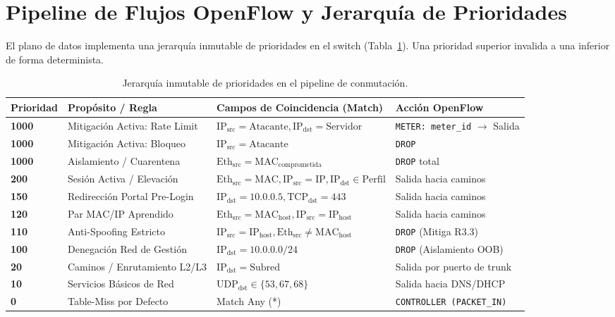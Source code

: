\documentclass[11pt,a4paper]{report}
\begin{document}
\section{Pipeline de Flujos OpenFlow y Jerarquía de Prioridades}
El plano de datos implementa una jerarquía inmutable de prioridades en el switch (Tabla~\ref{tab:pipeline}). Una prioridad superior invalida a una inferior de forma determinista.

\begin{table}[h!]
\centering
\small
\begin{tabularx}{\linewidth}{lp{4.2cm}p{4.2cm}X}
\toprule
\textbf{Prioridad} & \textbf{Propósito / Regla} & \textbf{Campos de Coincidencia (Match)} & \textbf{Acción OpenFlow} \\
\midrule
\textbf{1000} & Mitigación Activa: Rate Limit & $\text{IP}_{\text{src}} = \text{Atacante}, \text{IP}_{\text{dst}} = \text{Servidor}$ & \texttt{METER: meter\_id} $\rightarrow$ Salida \\
\textbf{1000} & Mitigación Activa: Bloqueo & $\text{IP}_{\text{src}} = \text{Atacante}$ & \texttt{DROP} \\
\textbf{1000} & Aislamiento / Cuarentena & $\text{Eth}_{\text{src}} = \text{MAC}_{\text{comprometida}}$ & \texttt{DROP} total \\
\textbf{200} & Sesión Activa / Elevación & $\text{Eth}_{\text{src}} = \text{MAC}, \text{IP}_{\text{src}} = \text{IP}, \text{IP}_{\text{dst}} \in \text{Perfil}$ & Salida hacia caminos \\
\textbf{150} & Redirección Portal Pre-Login & $\text{IP}_{\text{dst}} = 10.0.0.5, \text{TCP}_{\text{dst}} = 443$ & Salida hacia caminos \\
\textbf{120} & Par MAC/IP Aprendido & $\text{Eth}_{\text{src}} = \text{MAC}_{\text{host}}, \text{IP}_{\text{src}} = \text{IP}_{\text{host}}$ & Salida hacia caminos \\
\textbf{110} & Anti-Spoofing Estricto & $\text{IP}_{\text{src}} = \text{IP}_{\text{host}}, \text{Eth}_{\text{src}} \neq \text{MAC}_{\text{host}}$ & \texttt{DROP} (Mitiga R3.3) \\
\textbf{100} & Denegación Red de Gestión & $\text{IP}_{\text{dst}} = 10.0.0.0/24$ & \texttt{DROP} (Aislamiento OOB) \\
\textbf{20} & Caminos / Enrutamiento L2/L3 & $\text{IP}_{\text{dst}} = \text{Subred}$ & Salida por puerto de trunk \\
\textbf{10} & Servicios Básicos de Red & $\text{UDP}_{\text{dst}} \in \{53, 67, 68\}$ & Salida hacia DNS/DHCP \\
\textbf{0} & Table-Miss por Defecto & Match Any (*) & \texttt{CONTROLLER (PACKET\_IN)} \\
\bottomrule
\end{tabularx}
\caption{Jerarquía inmutable de prioridades en el pipeline de conmutación.}
\label{tab:pipeline}
\end{table}
\end{document}
